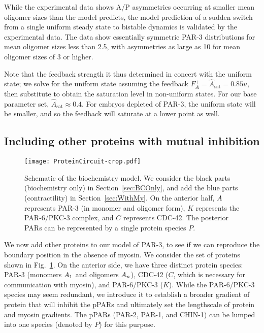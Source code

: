 \documentclass[11pt]{article}
\newcommand{\6}[1]{#1_{\text{6}}}
\newcommand{\3}[1]{#1_{\text{3}}}
\begin{document}
While the experimental data shows A/P asymmetries occurring at smaller mean oligomer sizes than the model predicts, the model prediction of a sudden switch from a single uniform steady state to bistable dynamics is validated by the experimental data. The data show essentially symmetric PAR-3 distributions for mean oligomer sizes less than 2.5, with asymmetries as large as 10 for mean oligomer sizes of 3 or higher. 

Note that the feedback strength it thus determined in concert with the uniform state; we solve for the uniform state assuming the feedback $ F_A^+=\hat A_\text{sat}=0.85 u$, then substitute to obtain the saturation level in non-uniform states. For our base parameter set, $\hat A_\text{sat} \approx 0.4$. For embryos depleted of PAR-3, the uniform state will be smaller, and so the feedback will saturate at a lower point as well.  

\subsection{Including other proteins with mutual inhibition \label{sec:BCOnly}}
\begin{figure}
\centering
\texttt{[image: ProteinCircuit-crop.pdf]}
\caption{\label{fig:ModelSch}Schematic of the biochemistry model. We consider the black parts (biochemistry only) in Section\ \ref{sec:BCOnly}, and add the blue parts (contractility) in Section\ \ref{sec:WithMy}. On the anterior half, $A$ represents PAR-3 (in monomer and oligomer form), $K$ represents the PAR-6/PKC-3 complex, and $C$ represents CDC-42. The posterior PARs can be represented by a single protein species $P$.}
\end{figure}

We now add other proteins to our model of PAR-3, to see if we can reproduce the boundary position in the absence of myosin. We consider the set of proteins shown in Fig.\ \ref{fig:ModelSch}. On the anterior side, we have three distinct protein species: PAR-3 (monomers $A_1$ and oligomers $A_n$), CDC-42 ($C$, which is necessary for communication with myosin), and PAR-6/PKC-3 ($K$). While the PAR-6/PKC-3 species may seem redundant, we introduce it to establish a broader gradient of protein that will inhibit the pPARs and ultimately set the lengthscale of protein and myosin gradients. The pPARs (PAR-2, PAR-1, and CHIN-1) can be lumped into one species (denoted by $P$) for this purpose.
\end{document}
